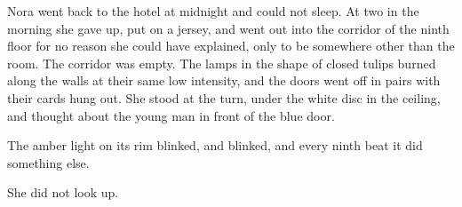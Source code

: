 Nora went back to the hotel at midnight and could not sleep. At two in the morning she gave up, put on a jersey, and went out into the corridor of the ninth floor for no reason she could have explained, only to be somewhere other than the room. The corridor was empty. The lamps in the shape of closed tulips burned along the walls at their same low intensity, and the doors went off in pairs with their cards hung out. She stood at the turn, under the white disc in the ceiling, and thought about the young man in front of the blue door.

The amber light on its rim blinked, and blinked, and every ninth beat it did something else.

She did not look up.



